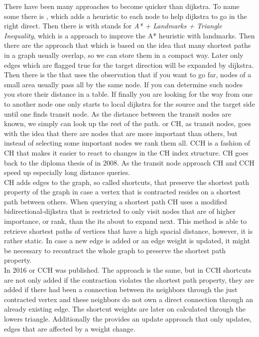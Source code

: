 There have been many approaches to become quicker than dijkstra. To name some there is \cite[A*]{A_Star}, which adds a heuristic to each node to help dijkstra to go in the right direct. Then there is \cite[ALT]{ALT} with stands for 
\textit{A* + Landmarks + Triangle Inequality}, which is a approach to improve the A* heuristic with landmarks. Then there are the \cite[Arc Flag]{ARC_FLAG} approach that which is based on the idea that many shortest paths in a graph
usually overlap, so we can store them in a compact way. Later only edges which are flagged true for the target direction will be expanded by dijkstra.
Then there is the \cite[Transit-Node]{Bast_2007} that uses the observation that if you want to go far, nodes of a small area usually pass all by the same node. If you can determine such nodes you store their distance in a table. If finally you are looking
for the way from one to another node one only starts to local dijkstra for the source and the target side until one finds transit node. As the distance between the transit nodes are known, we simply can look up the rest of the path.
\cite[Contraction Hierarchies]{Geisberger_2012} or CH, as transit nodes, goes with the idea that there are nodes that are more important than others, but instead of selecting some important nodes we rank them all. CCH is a fashion
of CH that makes it easier to react to changes in the CH index structure. CH goes back to the diploma thesis of \cite[Geisberger]{Geisberger} in 2008. As the transit node approach CH and CCH speed up 
especially long distance queries. \\ 
CH adds edges to the graph,
so called shortcuts, that preserve the shortest path property of the graph in case a vertex that is contracted resides on a shortest path between others. When querying a shortest
path CH uses a modified bidirectional-dijkstra that is restricted to only visit nodes that are of higher importance, or rank, than the its about to expand next.
This method is able to retrieve shortest paths of vertices that have a high spacial distance, however, it is rather static. In case a new edge is added or an edge weight is updated, 
it might be necessary to recontract the whole graph to preserve the shortest path property. \\
In 2016 \cite[Customization Contraction Hierarchies]{CCH} or CCH was published. The approach is the same, but in CCH shortcuts are not only added if the contraction violates the shortest path property,
they are added if there had been a connection between its neighbors through the just contracted vertex and these neighbors do not own a direct connection through an already existing edge.
The shortcut weights are later on calculated through the lowers triangle. Additionally the \cite[Customization Contraction Hierarchies]{CCH} provides an update approach that only updates,
edges that are affected by a weight change.


